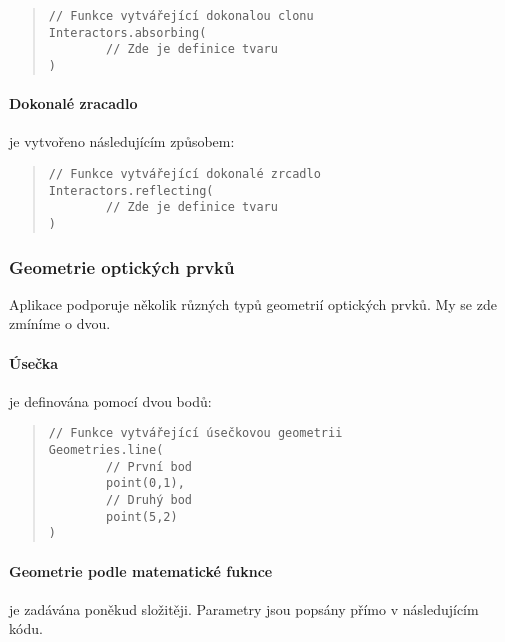\begin{minipage}{\textwidth}\begin{quote}\begin{lstlisting}
// Funkce vytvářející dokonalou clonu
Interactors.absorbing(
        // Zde je definice tvaru
)
\end{lstlisting}\end{quote}\end{minipage}
    

\paragraph{Dokonalé zracadlo} je vytvořeno následujícím způsobem:

\begin{minipage}{\textwidth}\begin{quote}\begin{lstlisting}
// Funkce vytvářející dokonalé zrcadlo
Interactors.reflecting(
        // Zde je definice tvaru
)
\end{lstlisting}\end{quote}\end{minipage}


\subsubsection{Geometrie optických prvků}

Aplikace podporuje několik různých typů geometrií optických prvků. My se zde zmíníme o dvou.

\paragraph{Úsečka} je definována pomocí dvou bodů:

\begin{minipage}{\textwidth}\begin{quote}\begin{lstlisting}
// Funkce vytvářející úsečkovou geometrii
Geometries.line(
        // První bod
        point(0,1),
        // Druhý bod
        point(5,2)
)
\end{lstlisting}\end{quote}\end{minipage}



\paragraph{Geometrie podle matematické fuknce} je zadávána poněkud složitěji. Parametry jsou popsány přímo v následujícím kódu.


